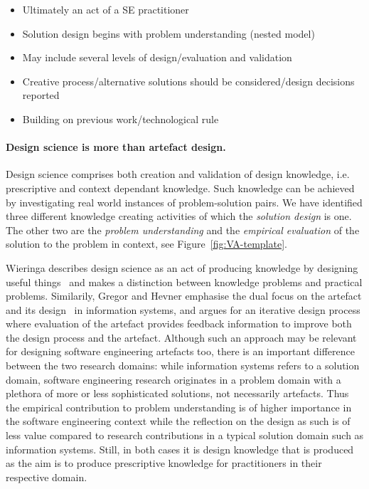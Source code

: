 \documentclass[graybox]{svmult}
\begin{document}
\begin{itemize}
\item Ultimately an act of a SE practitioner
\item Solution design begins with problem understanding (nested model)
\item May include several levels of design/evaluation and validation 
\item Creative process/alternative solutions should be considered/design decisions reported
\item Building on previous work/technological rule	
\end{itemize}



\paragraph{Design science is more than artefact design.}

Design science comprises both creation and validation of design knowledge, i.e. prescriptive and context dependant knowledge. Such knowledge can be achieved by investigating real world instances of problem-solution pairs. We have identified three different knowledge creating activities of which the \emph{solution design} is one. The other two are the \emph{problem understanding} and the \emph{empirical evaluation} of the solution to the problem in context, see Figure~\ref{fig:VA-template}.

Wieringa describes design science as an act of producing knowledge by designing useful things~\cite{wieringa_design_2009} and makes a distinction between knowledge problems and practical problems. Similarily, Gregor and Hevner emphasise the dual focus on the artefact and its design~\cite{gregor_positioning_2013} in information systems, and argues for an iterative design process where evaluation of the artefact provides feedback information to improve both the design process and the artefact. Although such an approach may be relevant for designing software engineering artefacts too, there is an important difference between the two research domains: while information systems refers to a solution domain, software engineering research originates in a problem domain with a plethora of more or less sophisticated solutions, not necessarily artefacts. Thus the empirical contribution to problem understanding is of higher importance in the software engineering context while the reflection on the design as such is of less value compared to research contributions in a typical solution domain such as information systems. Still, in both cases it is design knowledge that is produced as the aim is to produce prescriptive knowledge for practitioners in their respective domain. 
\end{document}
